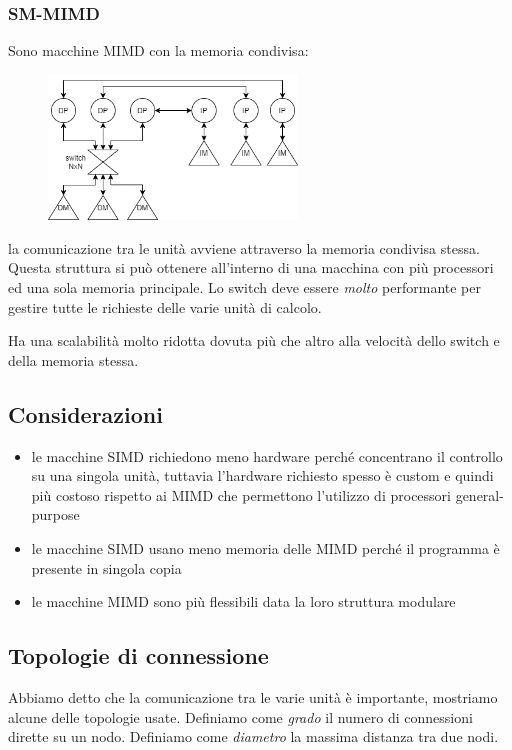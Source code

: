 \subsubsection{SM-MIMD}
Sono macchine MIMD con la memoria condivisa:
\begin{figure}[H]
    \centering
    \includegraphics[width=250px]{images/2_Tassonomia_di_Flynn/SM-MIMD.png}
\end{figure}
la comunicazione tra le unità avviene attraverso la memoria condivisa stessa.
Questa struttura si può ottenere all'interno di una macchina con più processori ed una sola memoria principale.
Lo switch deve essere \emph{molto} performante per gestire tutte le richieste delle varie unità di calcolo.

Ha una scalabilità molto ridotta dovuta più che altro alla velocità dello switch e della memoria stessa.

\subsection{Considerazioni}
\begin{itemize}
    \item le macchine SIMD richiedono meno hardware perché concentrano il controllo su una singola unità, tuttavia l'hardware richiesto spesso è custom e quindi più costoso rispetto ai MIMD che permettono l'utilizzo di processori general-purpose
    
    \item le macchine SIMD usano meno memoria delle MIMD perché il programma è presente in singola copia
    
    \item le macchine MIMD sono più flessibili data la loro struttura modulare
\end{itemize}

\subsection{Topologie di connessione}
Abbiamo detto che la comunicazione tra le varie unità è importante, mostriamo alcune delle topologie usate. Definiamo come \emph{grado} il numero di connessioni dirette su un nodo. Definiamo come \emph{diametro} la massima distanza tra due nodi.

